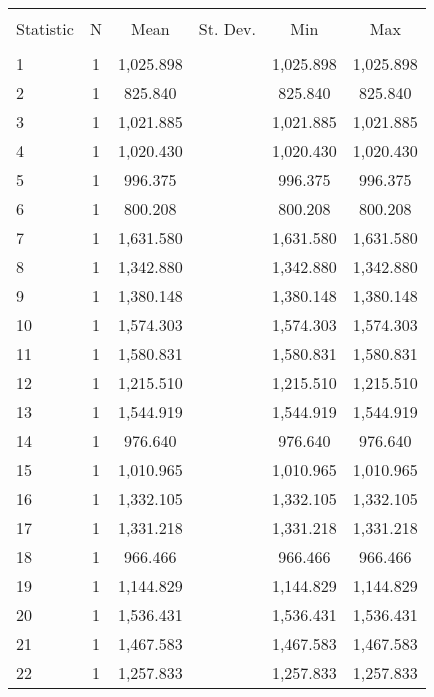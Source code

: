 
\begin{table}[!htbp] \centering 
  \caption{} 
  \label{} 
\begin{tabular}{@{\extracolsep{5pt}}lccccc} 
\\[-1.8ex]\hline 
\hline \\[-1.8ex] 
Statistic & \multicolumn{1}{c}{N} & \multicolumn{1}{c}{Mean} & \multicolumn{1}{c}{St. Dev.} & \multicolumn{1}{c}{Min} & \multicolumn{1}{c}{Max} \\ 
\hline \\[-1.8ex] 
1 & 1 & 1,025.898 &  & 1,025.898 & 1,025.898 \\ 
2 & 1 & 825.840 &  & 825.840 & 825.840 \\ 
3 & 1 & 1,021.885 &  & 1,021.885 & 1,021.885 \\ 
4 & 1 & 1,020.430 &  & 1,020.430 & 1,020.430 \\ 
5 & 1 & 996.375 &  & 996.375 & 996.375 \\ 
6 & 1 & 800.208 &  & 800.208 & 800.208 \\ 
7 & 1 & 1,631.580 &  & 1,631.580 & 1,631.580 \\ 
8 & 1 & 1,342.880 &  & 1,342.880 & 1,342.880 \\ 
9 & 1 & 1,380.148 &  & 1,380.148 & 1,380.148 \\ 
10 & 1 & 1,574.303 &  & 1,574.303 & 1,574.303 \\ 
11 & 1 & 1,580.831 &  & 1,580.831 & 1,580.831 \\ 
12 & 1 & 1,215.510 &  & 1,215.510 & 1,215.510 \\ 
13 & 1 & 1,544.919 &  & 1,544.919 & 1,544.919 \\ 
14 & 1 & 976.640 &  & 976.640 & 976.640 \\ 
15 & 1 & 1,010.965 &  & 1,010.965 & 1,010.965 \\ 
16 & 1 & 1,332.105 &  & 1,332.105 & 1,332.105 \\ 
17 & 1 & 1,331.218 &  & 1,331.218 & 1,331.218 \\ 
18 & 1 & 966.466 &  & 966.466 & 966.466 \\ 
19 & 1 & 1,144.829 &  & 1,144.829 & 1,144.829 \\ 
20 & 1 & 1,536.431 &  & 1,536.431 & 1,536.431 \\ 
21 & 1 & 1,467.583 &  & 1,467.583 & 1,467.583 \\ 
22 & 1 & 1,257.833 &  & 1,257.833 & 1,257.833 \\ 

\end{tabular}
\end{table}
